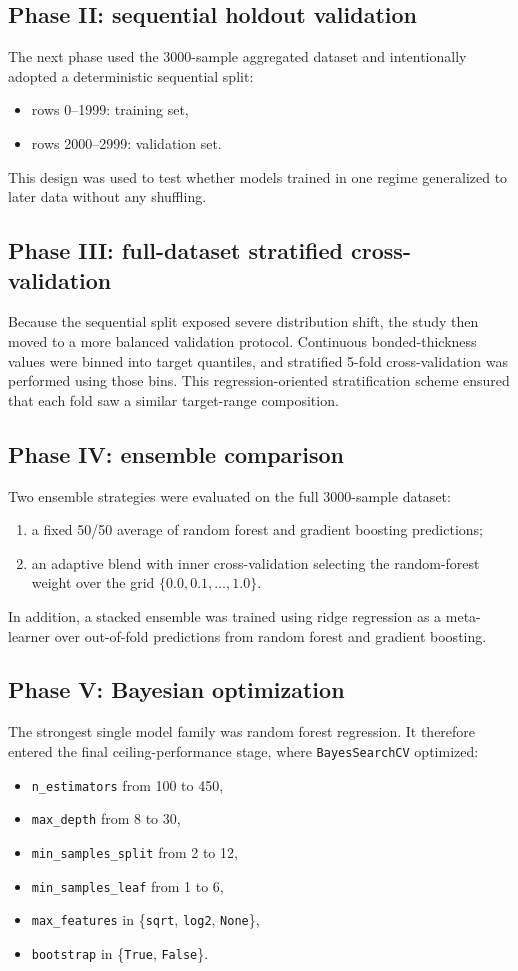 \documentclass[11pt]{article}
\begin{document}
\subsection{Phase II: sequential holdout validation}
The next phase used the 3000-sample aggregated dataset and intentionally adopted a deterministic sequential split:
\begin{itemize}
    \item rows 0--1999: training set,
    \item rows 2000--2999: validation set.
\end{itemize}
This design was used to test whether models trained in one regime generalized to later data without any shuffling.

\subsection{Phase III: full-dataset stratified cross-validation}
Because the sequential split exposed severe distribution shift, the study then moved to a more balanced validation protocol. Continuous bonded-thickness values were binned into target quantiles, and stratified 5-fold cross-validation was performed using those bins. This regression-oriented stratification scheme ensured that each fold saw a similar target-range composition.

\subsection{Phase IV: ensemble comparison}
Two ensemble strategies were evaluated on the full 3000-sample dataset:
\begin{enumerate}
    \item a fixed 50/50 average of random forest and gradient boosting predictions;
    \item an adaptive blend with inner cross-validation selecting the random-forest weight over the grid $\{0.0,0.1,\ldots,1.0\}$.
\end{enumerate}
In addition, a stacked ensemble was trained using ridge regression as a meta-learner over out-of-fold predictions from random forest and gradient boosting.

\subsection{Phase V: Bayesian optimization}
The strongest single model family was random forest regression. It therefore entered the final ceiling-performance stage, where \texttt{BayesSearchCV} optimized:
\begin{itemize}
    \item \texttt{n\_estimators} from 100 to 450,
    \item \texttt{max\_depth} from 8 to 30,
    \item \texttt{min\_samples\_split} from 2 to 12,
    \item \texttt{min\_samples\_leaf} from 1 to 6,
    \item \texttt{max\_features} in \{\texttt{sqrt}, \texttt{log2}, \texttt{None}\},
    \item \texttt{bootstrap} in \{\texttt{True}, \texttt{False}\}.
\end{itemize}
\end{document}
